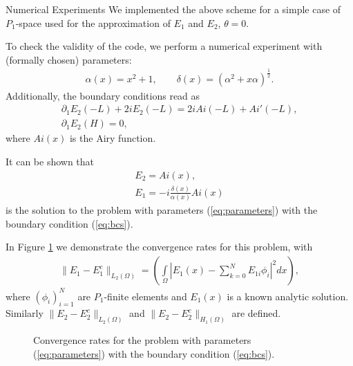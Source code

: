 \documentclass[11pt]{amsart}
\begin{document}
\begin{subsection}{Numerical Experiments}
We implemented the above scheme for a simple case of $P_{1}$-space used for the approximation of $E_{1}$ and $E_{2}$, $\theta=0$. 

To check the validity of the code, we perform a numerical experiment with (formally chosen) parameters:
\begin{align}
\label{eq:parameters}
\alpha(x)=x^2+1,\qquad \delta(x)=\left(\alpha^2+x\alpha\right)^{\frac{1}{2}}.
\end{align}
Additionally, the boundary conditions read as 
\begin{align}
\label{eq:bcs}
\partial_{1}E_{2}(-L)+2iE_{2}(-L)=2iAi(-L)+Ai'(-L),\\
\partial_{1}E_{2}(H)=0,
\end{align}
where $Ai(x)$ is the Airy function.

It can be shown that 
\begin{align*}
E_{2}=Ai(x),\\
E_{1}=-i\frac{\delta(x)}{\alpha(x)}Ai(x)
\end{align*}
is the solution to the problem with parameters (\ref{eq:parameters}) with the boundary condition (\ref{eq:bcs}).

In Figure \ref{fig:conv_rate} we demonstrate the convergence rates for this problem, with 
\begin{align*}
\|E_{1}-E_{1}^{c}\|_{L_{2}(\Omega)}=\left(\int\limits_{\Omega}\left|E_{1}(x)-\sum\limits_{k=0}^{N}E_{1i}\phi_{i}\right|^2dx\right),
\end{align*}
where $\left(\phi_{i}\right)_{i=1}^{N}$ are $P_{1}$-finite elements and $E_{1}(x)$ is a known analytic solution. Similarly $\|E_{2}-E_{2}^{c}\|_{L_{2}(\Omega)}$ and $\|E_{2}-E_{2}^{c}\|_{H_{1}(\Omega)}$ are defined. 

\begin{figure}
    \caption{Convergence rates for the problem with parameters (\ref{eq:parameters}) with the boundary condition (\ref{eq:bcs}).}
    \label{fig:conv_rate}
\end{figure}


\end{subsection}
\end{document}

